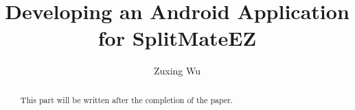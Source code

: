 \documentclass[sigconf]{acmart}
\begin{document}
\title{Developing an Android Application for SplitMateEZ}

\author{Zuxing Wu}

\renewcommand{\shortauthors}{Zuxing Wu}

\begin{abstract}
  This part will be written after the completion of the paper.
\end{abstract}

\end{document}
